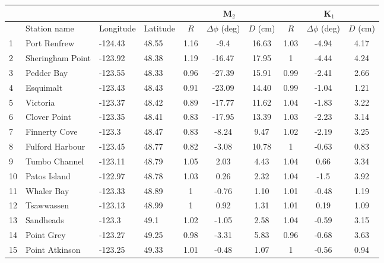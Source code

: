 \documentclass{tATO2e}
\begin{document}
\begin{table}[h]
\centering 
{}
{\begin{tabular}{l l l l c c c c c c} 
\hline 
& & & & \multicolumn{3}{c}{M$_2$} & \multicolumn{3}{c}{K$_1$} \\ 
\hline 
            & Station name     & Longitude & Latitude & $R$ & $ \Delta \phi$ (deg) & $D$ (cm) & $R$ & $ \Delta \phi$ (deg) & $D$ (cm) \\
\hline 
1 & Port Renfrew & -124.43 & 48.55 & 1.16 & -9.4 & 16.63  & 1.03 & -4.94 & 4.17 \\
2 & Sheringham Point & -123.92 & 48.38 & 1.19 & -16.47 & 17.95  & 1 & -4.44 & 4.24 \\
3 & Pedder Bay & -123.55 & 48.33 & 0.96 & -27.39 & 15.91  & 0.99 & -2.41 & 2.66 \\
4 & Esquimalt & -123.43 & 48.43 & 0.91 & -23.09 & 14.40  & 0.99 & -1.04 & 1.21 \\
5 & Victoria & -123.37 & 48.42 & 0.89 & -17.77 & 11.62  & 1.04 & -1.83 & 3.22 \\
6 & Clover Point & -123.35 & 48.41 & 0.83 & -17.95 & 13.39  & 1.03 & -2.23 & 3.14 \\
7 & Finnerty Cove & -123.3 & 48.47 & 0.83 & -8.24 & 9.47  & 1.02 & -2.19 & 3.25 \\
8 & Fulford Harbour & -123.45 & 48.77 & 0.82 & -3.08 & 10.78  & 1 & -0.63 & 0.83 \\
9 & Tumbo Channel & -123.11 & 48.79 & 1.05 & 2.03 & 4.43  & 1.04 & 0.66 & 3.34 \\
10 & Patos Island & -122.97 & 48.78 & 1.03 & 0.26 & 2.32  & 1.04 & -1.5 & 3.92 \\
11 & Whaler Bay & -123.33 & 48.89 & 1 & -0.76 & 1.10  & 1.01 & -0.48 & 1.19 \\
12 & Tsawwassen & -123.13 & 48.99 & 1 & 0.92 & 1.31  & 1.01 & 0.19 & 1.09 \\
13 & Sandheads & -123.3 & 49.1 & 1.02 & -1.05 & 2.58  & 1.04 & -0.59 & 3.15 \\
14 & Point Grey & -123.27 & 49.25 & 0.98 & -3.31 & 5.83  & 0.96 & -0.68 & 3.63 \\
15 & Point Atkinson & -123.25 & 49.33 & 1.01 & -0.48 & 1.07  & 1 & -0.56 & 0.94 \\

\end{tabular}}
\end{table}
\end{document}
